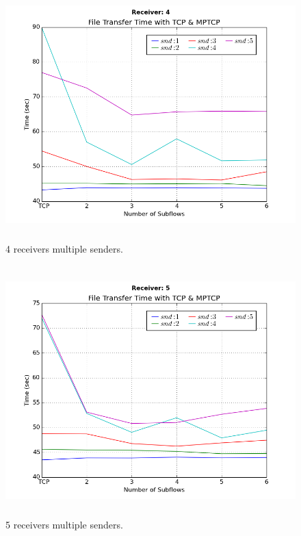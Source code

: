 \documentclass[10pt]{report}
\begin{document}
\begin{appendices}
  \begin{figure}
    \includegraphics[width=\textwidth,height=3.8in]{images/rcv_4.png}
    \caption{4 receivers multiple senders.}
    \label{fig:rcv4}
  \end{figure}

  \begin{figure}
    \includegraphics[width=\textwidth,height=3.8in]{images/rcv_5.png}
    \caption{5 receivers multiple senders.}
    \label{fig:rcv5}
  \end{figure}


\end{appendices}
\end{document}
